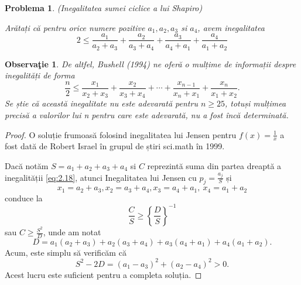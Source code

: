 \documentclass[a4paper,12pt,oneside]{report}
\newtheorem{problem}{Problema}
\newtheorem{remark}{Observa\c{t}ie}
\begin{document}
\begin{problem} (Inegalitatea sumei ciclice a lui Shapiro)

Arătați că pentru orice numere pozitive
 \(a_{1} , a_{2} , a_{3}\)  si \(  a_{4}\), avem inegalitatea
 \begin{displaymath}
     2\leq \frac{a_{1}}{a_{2} + a_{3}} + \frac{a_{2}}{a_{3} + a_{4}} + \frac{a_{3}}{a_{4} + a_{1}} + \frac{a_{4}}{a_{1} + a_{2}} \label{eq:2.20} \tag{2.20}
 \end{displaymath}
 \end{problem}
 \begin{remark}
De altfel,  Bushell (1994) ne oferă o mulțime de informații despre inegalități de forma
\begin{displaymath}
    \frac{n}{2} \leq \frac{x_{1}}{x_{2} + x_{3}} + \frac{x_{2}}{x_{3} + x_{4}} + \cdots+ \frac{x_{n - 1}}{x_{n} + x_{1}} + \frac{x_{n}}{x_{1} + x_{2}}.
\end{displaymath}
Se știe că această inegalitate nu este adevarată pentru  \(n\geq 25\), totuși mulțimea precisă a valorilor lui n pentru care este adevarată, nu a fost încă determinată.
\end{remark}
\begin{proof}
O soluție frumoasă folosind inegalitatea lui Jensen pentru \(f\left ( x \right ) = \frac{1}{x}\) a fost dată de Robert Israel în grupul de știri sci.math în 1999.

Dacă notăm \(S = a_{1} + a_{2} + a_{3} + a_{4}\) si \(C\) reprezintă suma din partea dreaptă a inegalității \ref{eq:2.18}, atunci Inegalitatea lui Jensen cu \(p_{j} = \frac{a_{j}}{S}\) și
\[x_{1} = a_{2} + a_{3}, x_{2} = a_{3} + a_{4}, x_{3} = a_{4} + a_{1},~x_{4} = a_{1} + a_{2}\] conduce la
\[\frac{C}{S} \geq \left \{ \frac{D}{S} \right \}^{-1}\]
 sau \(C \geq \frac{S^{2}}{D}\), unde am notat
\begin{displaymath}
    D = a_{1}\left ( a_{2} + a_{3} \right ) + a_{2}\left ( a_{3} + a_{4} \right ) + a_{3}\left ( a_{4} + a_{1} \right ) + a_{4}\left ( a_{1} + a_{2} \right ).
\end{displaymath}
Acum, este simplu să verificăm că
\begin{displaymath}
    S^{2} - 2D = \left ( a_{1} - a_{3} \right )^{2} + \left ( a_{2} - a_{4} \right )^{2}> 0.
\end{displaymath}
Acest lucru este suficient pentru a completa soluția.
\end{proof}
\end{document}
